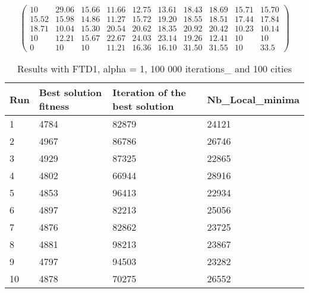 \documentclass[12pt,oneside,a4paper]{article}
\begin{document}
\begin{equation}
  \tag{Mean Tabu Duration for each city (alpha = 5 and 50 cities)}
  \begin{pmatrix} 10 & 29.06 & 15.66 & 11.66 & 12.75 & 13.61 & 18.43 & 18.69 & 15.71 & 15.70 \\
    15.52 & 15.98 & 14.86 & 11.27 & 15.72 & 19.20 & 18.55 & 18.51 & 17.44 & 17.84 \\
    18.71 & 10.04 & 15.30 & 20.54 & 20.62 & 18.35 & 20.92 & 20.42 & 10.23 & 10.14 \\
    10 & 12.21 & 15.67 & 22.67 & 24.03 & 23.14 & 19.26 & 12.41 & 10 & 10 \\
    0 & 10 & 10 & 11.21 & 16.36 & 16.10 & 31.50 & 31.55 & 10 & 33.5
  \end{pmatrix}
\end{equation}

\begin{table}[h]
  \centering
  \small
  \begin{tabular}{llll}
    \hline
    \multicolumn{1}{|l|}{\textbf{Run}}& \multicolumn{1}{l|}{\textbf{Best solution fitness}}& \multicolumn{1}{l|}{\textbf{Iteration of the best solution}}& \multicolumn{1}{l|}{\textbf{Nb\_Local\_minima}}\\ \hline
    \multicolumn{1}{|l|}{1} & \multicolumn{1}{l|}{4784}  & \multicolumn{1}{l|}{82879} & \multicolumn{1}{l|}{24121}  \\ \hline
    \multicolumn{1}{|l|}{2} & \multicolumn{1}{l|}{4967}  & \multicolumn{1}{l|}{86786} & \multicolumn{1}{l|}{26746}  \\ \hline
    \multicolumn{1}{|l|}{3} & \multicolumn{1}{l|}{4929}  & \multicolumn{1}{l|}{87325}  & \multicolumn{1}{l|}{22865}  \\ \hline
    \multicolumn{1}{|l|}{4} & \multicolumn{1}{l|}{4802}  & \multicolumn{1}{l|}{66944}  & \multicolumn{1}{l|}{28916}  \\ \hline
    \multicolumn{1}{|l|}{5} & \multicolumn{1}{l|}{4853}  & \multicolumn{1}{l|}{96413}  & \multicolumn{1}{l|}{22934}  \\ \hline
    \multicolumn{1}{|l|}{6} & \multicolumn{1}{l|}{4897}  & \multicolumn{1}{l|}{82213}  & \multicolumn{1}{l|}{25056}  \\ \hline
    \multicolumn{1}{|l|}{7} & \multicolumn{1}{l|}{4876}  & \multicolumn{1}{l|}{82862}  & \multicolumn{1}{l|}{23725}  \\ \hline
    \multicolumn{1}{|l|}{8} & \multicolumn{1}{l|}{4881}  & \multicolumn{1}{l|}{98213} & \multicolumn{1}{l|}{23867}  \\ \hline
    \multicolumn{1}{|l|}{9} & \multicolumn{1}{l|}{4797}  & \multicolumn{1}{l|}{94503} & \multicolumn{1}{l|}{23282}  \\ \hline
    \multicolumn{1}{|l|}{10} & \multicolumn{1}{l|}{4878}  & \multicolumn{1}{l|}{70275} & \multicolumn{1}{l|}{26552}  \\ \hline
  \end{tabular}
  \caption{Results with FTD1, alpha = 1, 100 000 iterations\_ and 100 cities}
\end{table}
\end{document}
